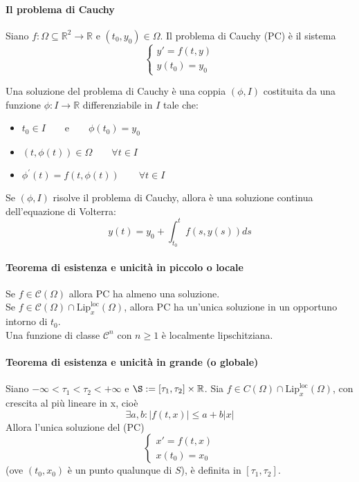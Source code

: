 \documentclass[a4paper,12pt]{article}
\newcommand{\cont}{\mathscr{C}}
\begin{document}
\paragraph{Il problema di Cauchy}
Siano $f:\Omega \subseteq \mathbb{R}^2 \rightarrow \mathbb{R}$ e $ \left(t_0,y_0\right) \in \Omega$. Il problema di Cauchy (PC) è il sistema
$$\label{PC}\begin{cases} y'=f\left(t,y\right) \\ y\left(t_0\right)=y_0 \end{cases}$$

Una soluzione del problema di Cauchy è una coppia $\left( \phi , I \right)$ costituita da una funzione $\phi: I \rightarrow \mathbb{R}$ differenziabile in $I$ tale che:
\begin{itemize}
\item $t_0 \in I\qquad\text{e}\qquad \phi\left(t_0\right)=y_0$
\item $ \left(t,\phi\left(t\right)\right) \in \Omega \qquad \forall t \in I$
\item $ \phi^{'}\left(t \right) = f\left(t,\phi\left(t\right)\right)\qquad \forall t \in I$
\end{itemize}

Se $\left(\phi,I\right)$ risolve il problema di Cauchy, allora è una soluzione continua dell'equazione di Volterra:
$$ y\left(t\right) = y_0 + \displaystyle\int^t_{t_0} f\left(s,y\left(s\right)\right) ds $$

\paragraph{Teorema di esistenza e unicità in piccolo o locale}
Se $f \in \cont \left(\Omega\right)$ allora PC ha almeno una soluzione. \\
Se $f \in \cont \left(\Omega\right) \cap \text{Lip}^{\text{loc}}_x\left(\Omega\right)$, allora PC ha un'unica soluzione in un opportuno intorno di $t_0$.\\
Una funzione di classe $\cont^n$ con $ n \geq 1 $ è localmente lipschitziana. 

\paragraph{Teorema di esistenza e unicità in grande (o globale)}
Siano $-\infty < \tau_1 < \tau_2 < +\infty$ e $\S:=\left[\tau_1,\tau_2\right]\times\mathbb{R}$. Sia $f \in C\left(\Omega\right) \cap \text{Lip}^{\text{loc}}_x\left(\Omega\right)$, con crescita al più lineare in x, cioè
$$\exists a,b: |f \left(t,x\right)|\leq a + b|x|$$
Allora l'unica soluzione del (PC)
$$\begin{cases} x'=f\left(t,x\right) \\ x\left(t_0\right)=x_0 \end{cases}$$
(ove $\left(t_0,x_0\right)$ è un punto qualunque di $S$), è definita in $\left[\tau_1,\tau_2\right]$.
\end{document}
